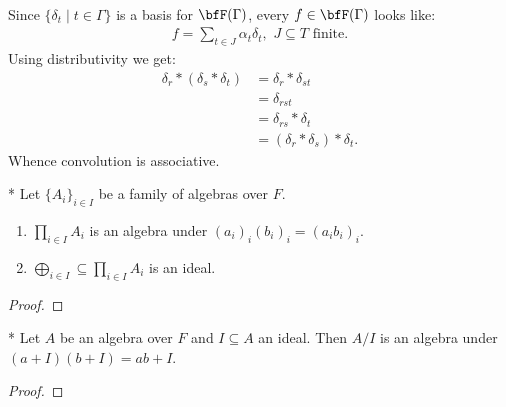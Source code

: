 \begin{example}
\begin{equation*}
\begin{split}
            \end{split}
            \end{equation*}
        Since $\{\delta_t \mid t \in \Gamma\}$ is a basis for $\bfF(\Gamma)$, every $f \in \bfF(\Gamma)$ looks like:
            \begin{equation*}
            \begin{split}
                f = \sum_{t \in J}\alpha_t \delta_t , \hspace{4pt}J \subseteq T \hspace{4pt}\text{finite}.
            \end{split}
            \end{equation*}
        Using distributivity we get:
            \begin{equation*}
            \begin{split}
                \delta_r \ast (\delta_s \ast \delta_t)
                & = \delta_r \ast \delta_{st} \\
                & = \delta_{rst} \\
                & = \delta_{rs} \ast \delta_t \\
                & = (\delta_r \ast \delta_s) \ast \delta_t.
            \end{split}
            \end{equation*}
        Whence convolution is associative.
    \end{example}

    \begin{center}
    \end{center}

    \begin{proposition}*
        Let $\{A_i\}_{i \in I}$ be a family of algebras over $F$.
        \begin{enumerate}[label = (\arabic*),itemsep=1pt,topsep=3pt]
            \item $\prod_{i \in I}A_i$ is an algebra under $(a_i)_i(b_i)_i = (a_ib_i)_i$.
            \item $\bigoplus_{i \in I} \subseteq \prod_{i \in I}A_i$ is an ideal.
        \end{enumerate}
    \end{proposition}
        \begin{proof}
            
        \end{proof}

    \begin{proposition}*
        Let $A$ be an algebra over $F$ and $I \subseteq A$ an ideal. Then $A/I$ is an algebra under $(a+I)(b+I) = ab+I$.
    \end{proposition}
        \begin{proof}
            
        \end{proof}



    
    
